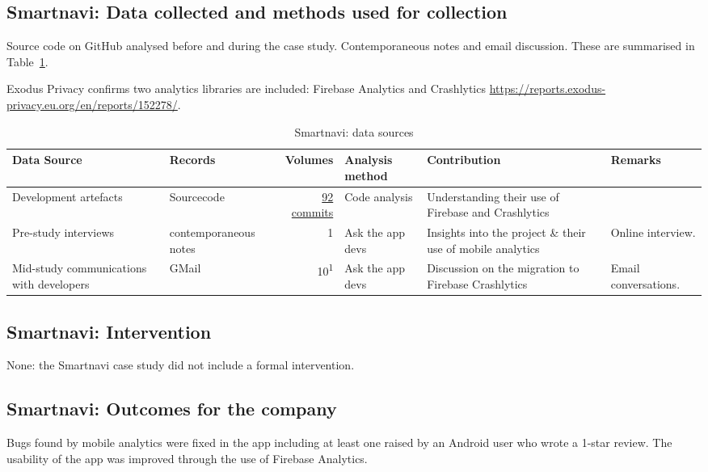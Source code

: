 \subsection{Smartnavi: Data collected and methods used for collection}
Source code on GitHub analysed before and during the case study. Contemporaneous notes and email discussion. These are summarised in Table~\ref{tab:smartnavi-data-sources}.

Exodus Privacy confirms two analytics libraries are included: Firebase Analytics and Crashlytics \url{https://reports.exodus-privacy.eu.org/en/reports/152278/}.


\begin{table}
    \centering
    \footnotesize
    \tabcolsep=0.12cm
    \begin{tabular}{>{\raggedright}p{3cm}p{2.4cm}r>{\raggedright}p{2.1cm}>{\raggedright\arraybackslash}p{3cm}>{\raggedright\arraybackslash}p{2.2cm}}
        Data Source & Records & Volumes & Analysis method & Contribution & Remarks \\
        \toprule
        Development artefacts & Sourcecode\footnotemark & \href{https://github.com/Phantast/smartnavi/commits/master}{92 commits} & Code analysis & Understanding their use of Firebase and Crashlytics & \\
         Pre-study interviews & contemporaneous notes & 1 & Ask the app devs & Insights into the project \& their use of mobile analytics & Online interview. \\
         Mid-study communications with developers & GMail & 10\textsuperscript{1} & Ask the app devs & Discussion on the migration to Firebase Crashlytics & Email conversations. \\
         \bottomrule
    \end{tabular}
    \caption{Smartnavi: data sources}
    \label{tab:smartnavi-data-sources}
\end{table}


\subsection{Smartnavi: Intervention}
None: the Smartnavi case study did not include a formal intervention.

\subsection{Smartnavi: Outcomes for the company}
Bugs found by mobile analytics were fixed in the app including at least one raised by an Android user who wrote a 1-star review. The usability of the app was improved through the use of Firebase Analytics. 


